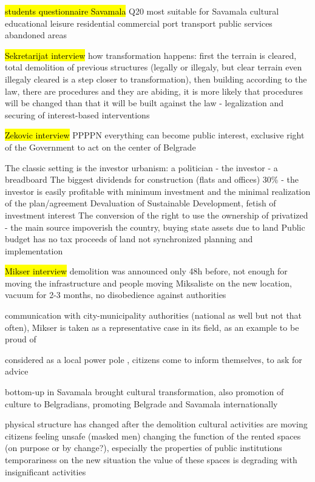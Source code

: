 \documentclass[11pt]{report}
\begin{document}
\hl{students questionnaire Savamala}
Q20 most suitable for Savamala
cultural
educational
leisure
residential
commercial
port
transport
public services
abandoned areas

\hl{Sekretarijat interview}
how transformation happens:
first the terrain is cleared, total demolition of previous structures (legally or illegaly, but clear terrain even illegaly cleared is a step closer to transformation), then building according to the law, there are procedures and they are abiding, it is more likely that procedures will be changed than that it will be built against the law - legalization and securing of interest-based interventions

\hl{Zekovic interview}
PPPPN everything can become public interest, exclusive  right of the Government to act on the center of Belgrade

The classic setting is the investor urbanism: a politician - the investor - a breadboard
The biggest dividends for construction (flats and offices) 30\% - the investor is easily profitable with minimum investment and the minimal realization of the plan/agreement
Devaluation of Sustainable Development,
fetish of investment interest
The conversion of the right to use the ownership of privatized - the main source impoverish the country, buying state assets due to land
Public budget has no tax proceeds of land
not synchronized planning and implementation

\hl{Mikser interview}
demolition was announced only 48h before, not enough for moving the infrastructure and people
moving Miksaliste on the new location, vacuum for 2-3 months, no disobedience against authorities

communication with city-municipality authorities (national as well but not that often), Mikser is taken as a representative case in its field, as an example to be proud of

considered as a local power pole , citizens come to inform themselves, to ask for advice

bottom-up in Savamala brought cultural transformation, also promotion of culture to Belgradians, promoting Belgrade and Savamala internationally

physical structure has changed after the demolition
cultural activities are moving
citizens feeling unsafe (masked men)
changing the function of the rented spaces (on purpose or by change?), especially the properties of public institutions
temporariness on the new situation
the value of these spaces is degrading with insignificant activities
\end{document}
